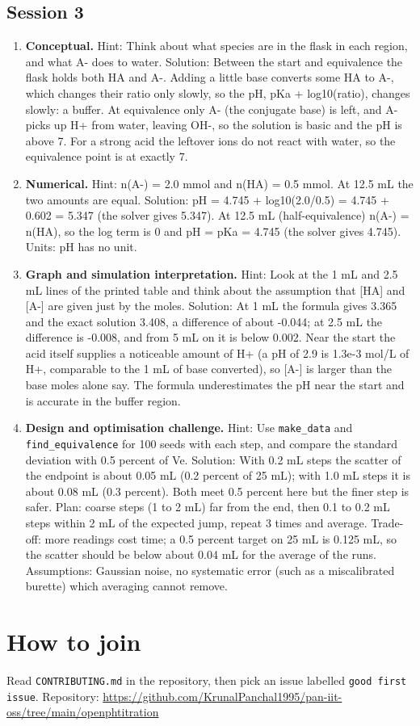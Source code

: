 \documentclass[11pt,a4paper]{article}
\begin{document}
\subsection*{Session 3}
\begin{enumerate}[nosep]
\item \textbf{Conceptual.} Hint: Think about what species are in the flask in each region, and what A- does to water. Solution: Between the start and equivalence the flask holds both HA and A-. Adding a little base converts some HA to A-, which changes their ratio only slowly, so the pH, pKa + log10(ratio), changes slowly: a buffer. At equivalence only A- (the conjugate base) is left, and A- picks up H+ from water, leaving OH-, so the solution is basic and the pH is above 7. For a strong acid the leftover ions do not react with water, so the equivalence point is at exactly 7.
\item \textbf{Numerical.} Hint: n(A-) = 2.0 mmol and n(HA) = 0.5 mmol. At 12.5 mL the two amounts are equal. Solution: pH = 4.745 + log10(2.0/0.5) = 4.745 + 0.602 = 5.347 (the solver gives 5.347). At 12.5 mL (half-equivalence) n(A-) = n(HA), so the log term is 0 and pH = pKa = 4.745 (the solver gives 4.745). Units: pH has no unit.
\item \textbf{Graph and simulation interpretation.} Hint: Look at the 1 mL and 2.5 mL lines of the printed table and think about the assumption that [HA] and [A-] are given just by the moles. Solution: At 1 mL the formula gives 3.365 and the exact solution 3.408, a difference of about -0.044; at 2.5 mL the difference is -0.008, and from 5 mL on it is below 0.002. Near the start the acid itself supplies a noticeable amount of H+ (a pH of 2.9 is 1.3e-3 mol/L of H+, comparable to the 1 mL of base converted), so [A-] is larger than the base moles alone say. The formula underestimates the pH near the start and is accurate in the buffer region.
\item \textbf{Design and optimisation challenge.} Hint: Use \texttt{make\_data} and \texttt{find\_equivalence} for 100 seeds with each step, and compare the standard deviation with 0.5 percent of Ve. Solution: With 0.2 mL steps the scatter of the endpoint is about 0.05 mL (0.2 percent of 25 mL); with 1.0 mL steps it is about 0.08 mL (0.3 percent). Both meet 0.5 percent here but the finer step is safer. Plan: coarse steps (1 to 2 mL) far from the end, then 0.1 to 0.2 mL steps within 2 mL of the expected jump, repeat 3 times and average. Trade-off: more readings cost time; a 0.5 percent target on 25 mL is 0.125 mL, so the scatter should be below about 0.04 mL for the average of the runs. Assumptions: Gaussian noise, no systematic error (such as a miscalibrated burette) which averaging cannot remove.
\end{enumerate}

\section{How to join}
Read \texttt{CONTRIBUTING.md} in the repository, then pick an issue labelled \texttt{good first issue}. Repository: \url{https://github.com/KrunalPanchal1995/pan-iit-oss/tree/main/openphtitration}
\end{document}
